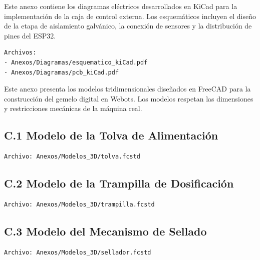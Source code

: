 

Este anexo contiene los diagramas eléctricos desarrollados en KiCad para la implementación de la caja de control externa. Los esquemáticos incluyen el diseño de la etapa de aislamiento galvánico, la conexión de sensores y la distribución de pines del ESP32.

\begin{verbatim}
Archivos:
- Anexos/Diagramas/esquematico_kiCad.pdf
- Anexos/Diagramas/pcb_kiCad.pdf
\end{verbatim}



Este anexo presenta los modelos tridimensionales diseñados en FreeCAD para la construcción del gemelo digital en Webots. Los modelos respetan las dimensiones y restricciones mecánicas de la máquina real.

\subsection*{C.1 Modelo de la Tolva de Alimentación}

\begin{verbatim}
Archivo: Anexos/Modelos_3D/tolva.fcstd
\end{verbatim}

\subsection*{C.2 Modelo de la Trampilla de Dosificación}

\begin{verbatim}
Archivo: Anexos/Modelos_3D/trampilla.fcstd
\end{verbatim}

\subsection*{C.3 Modelo del Mecanismo de Sellado}

\begin{verbatim}
Archivo: Anexos/Modelos_3D/sellador.fcstd
\end{verbatim}

